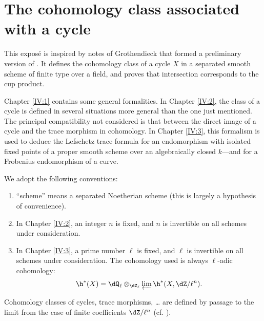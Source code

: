 
\chapter{The cohomology class associated with a cycle}\label{IV}





This exposé is inspired by notes of Grothendieck that formed a preliminary
version of \cite[IV]{sga5}. It defines the cohomology class of a cycle $X$ in
a separated smooth scheme of finite type over a field, and proves that
intersection corresponds to the cup product.

Chapter \ref{IV:1} contains some general formalities. In Chapter \ref{IV:2},
the class of a cycle is defined in several situations more general than the
one just mentioned. The principal compatibility not considered is that
between the direct image of a cycle and the trace morphism in cohomology. In
Chapter \ref{IV:3}, this formalism is used to deduce the Lefschetz trace
formula for an endomorphism with isolated fixed points of a proper smooth
scheme over an algebraically closed $k$---and for a Frobenius endomorphism of
a curve.

We adopt the following conventions:
\begin{enumerate}[\indent 1)]
  \item ``scheme'' means a separated Noetherian scheme (this is largely a
    hypothesis of convenience).
  \item In Chapter \ref{IV:2}, an integer $n$ is fixed, and $n$ is invertible
    on all schemes under consideration.
  \item In Chapter \ref{IV:3}, a prime number $\ell$ is fixed, and $\ell$ is
    invertible on all schemes under consideration. The cohomology used is
    always $\ell$-adic cohomology:
    \[
      \h^*(X) = \dQ_\ell\otimes_{\dZ_\ell} \varprojlim \h^*(X,\dZ/\ell^n) \text{.}
    \]
\end{enumerate}
Cohomology classes of cycles, trace morphisms, \ldots{} are defined by passage
to the limit from the case of finite coefficients $\dZ/\ell^n$ (cf.
\cite[VI]{sga5}).




















